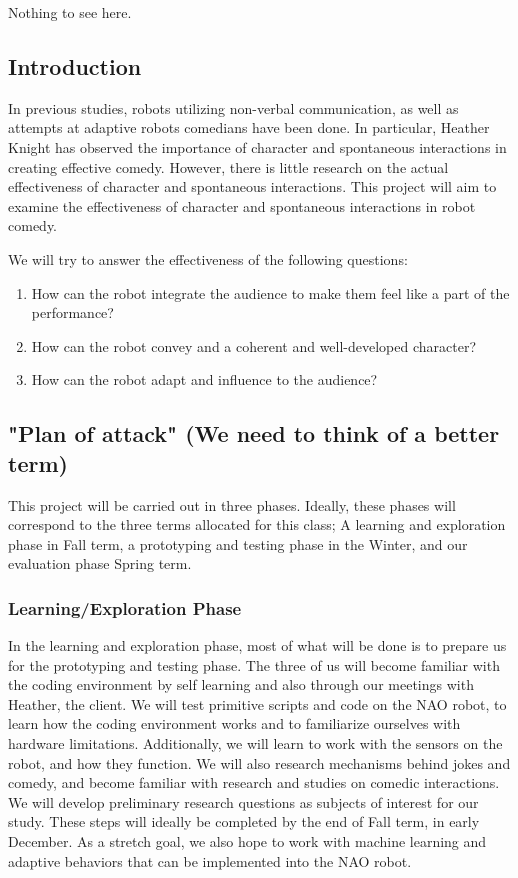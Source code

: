 \documentclass[onecolumn, draftclsnofoot,10pt, compsoc]{IEEEtran}
\begin{document}
Nothing to see here.

\subsection{Introduction}
In previous studies, robots utilizing non-verbal communication, as well as attempts at adaptive robots comedians have been done. In particular, Heather Knight has observed the importance of character and spontaneous interactions in creating effective comedy. However, there is little research on the actual effectiveness of character and spontaneous interactions. This project will aim to examine the effectiveness of character and spontaneous interactions in robot comedy.

We will try to answer the effectiveness of the following questions:
\begin{enumerate}[\IEEEsetlabelwidth{6)}]
\item How can the robot integrate the audience to make them feel like a part of the performance?
\item How can the robot convey and a coherent and well-developed character?
\item How can the robot adapt and influence to the audience?
\end{enumerate}


\subsection{"Plan of attack" (We need to think of a better term)}
This project will be carried out in three phases. Ideally, these phases will correspond to the three terms allocated for this class; A learning and exploration phase in Fall term, a prototyping and testing phase in the Winter, and our evaluation phase Spring term.

\subsubsection{Learning/Exploration Phase}
In the learning and exploration phase, most of what will be done is to prepare us for the prototyping and testing phase. The three of us will become familiar with the coding environment by self learning and also through our meetings with Heather, the client. We will test primitive scripts and code on the NAO robot, to learn how the coding environment works and to familiarize ourselves with hardware limitations. Additionally, we will learn to work with the sensors on the robot, and how they function. We will also research mechanisms behind jokes and comedy, and become familiar with research and studies on comedic interactions. We will develop preliminary research questions as subjects of interest for our study. These steps will ideally be completed by the end of Fall term, in early December. As a stretch goal, we also hope to work with machine learning and adaptive behaviors that can be implemented into the NAO robot.
\end{document}
